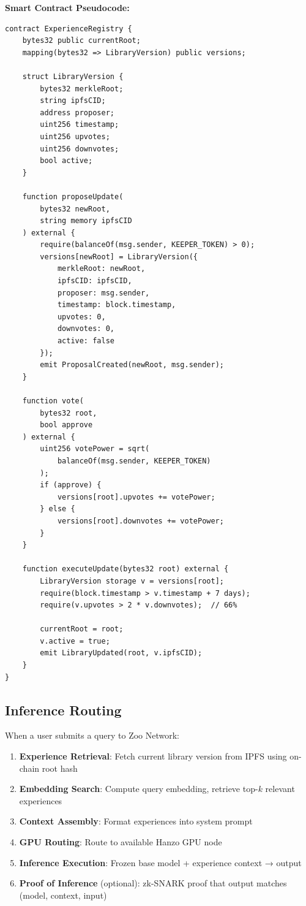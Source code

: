 \textbf{Smart Contract Pseudocode:}
\begin{verbatim}
contract ExperienceRegistry {
    bytes32 public currentRoot;
    mapping(bytes32 => LibraryVersion) public versions;

    struct LibraryVersion {
        bytes32 merkleRoot;
        string ipfsCID;
        address proposer;
        uint256 timestamp;
        uint256 upvotes;
        uint256 downvotes;
        bool active;
    }

    function proposeUpdate(
        bytes32 newRoot,
        string memory ipfsCID
    ) external {
        require(balanceOf(msg.sender, KEEPER_TOKEN) > 0);
        versions[newRoot] = LibraryVersion({
            merkleRoot: newRoot,
            ipfsCID: ipfsCID,
            proposer: msg.sender,
            timestamp: block.timestamp,
            upvotes: 0,
            downvotes: 0,
            active: false
        });
        emit ProposalCreated(newRoot, msg.sender);
    }

    function vote(
        bytes32 root,
        bool approve
    ) external {
        uint256 votePower = sqrt(
            balanceOf(msg.sender, KEEPER_TOKEN)
        );
        if (approve) {
            versions[root].upvotes += votePower;
        } else {
            versions[root].downvotes += votePower;
        }
    }

    function executeUpdate(bytes32 root) external {
        LibraryVersion storage v = versions[root];
        require(block.timestamp > v.timestamp + 7 days);
        require(v.upvotes > 2 * v.downvotes);  // 66%

        currentRoot = root;
        v.active = true;
        emit LibraryUpdated(root, v.ipfsCID);
    }
}
\end{verbatim}

\subsection{Inference Routing}

When a user submits a query to Zoo Network:

\begin{enumerate}
    \item \textbf{Experience Retrieval}: Fetch current library version from IPFS using on-chain root hash
    \item \textbf{Embedding Search}: Compute query embedding, retrieve top-$k$ relevant experiences
    \item \textbf{Context Assembly}: Format experiences into system prompt
    \item \textbf{GPU Routing}: Route to available Hanzo GPU node
    \item \textbf{Inference Execution}: Frozen base model + experience context → output
    \item \textbf{Proof of Inference} (optional): zk-SNARK proof that output matches (model, context, input)
\end{enumerate}


